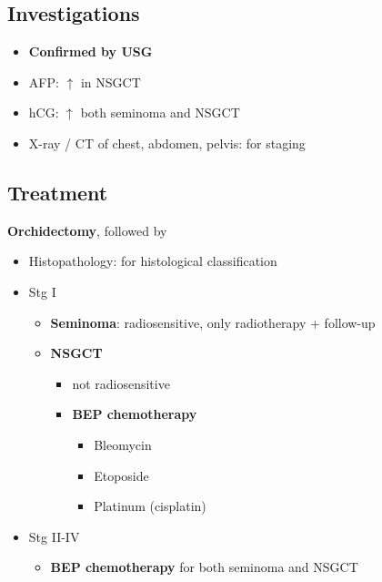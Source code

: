 \documentclass[
  12pt,
]{memoir}
\providecommand{\tightlist}{%
  \setlength{\itemsep}{0pt}\setlength{\parskip}{0pt}}
\begin{document}
\hypertarget{investigations-8}{%
\subsection{Investigations}\label{investigations-8}}

\begin{itemize}
\tightlist
\item
  \textbf{Confirmed by USG}
\item
  AFP: \(\uparrow\) in NSGCT
\item
  hCG: \(\uparrow\) both seminoma and NSGCT
\item
  X-ray / CT of chest, abdomen, pelvis: for staging
\end{itemize}

\hypertarget{treatment-8}{%
\subsection{Treatment}\label{treatment-8}}

\textbf{Orchidectomy}, followed by

\begin{itemize}
\tightlist
\item
  Histopathology: for histological classification
\item
  Stg I

  \begin{itemize}
  \tightlist
  \item
    \textbf{Seminoma}: radiosensitive, only radiotherapy + follow-up
  \item
    \textbf{NSGCT}

    \begin{itemize}
    \tightlist
    \item
      not radiosensitive
    \item
      \textbf{BEP chemotherapy}

      \begin{itemize}
      \tightlist
      \item
        Bleomycin
      \item
        Etoposide
      \item
        Platinum (cisplatin)
      \end{itemize}
    \end{itemize}
  \end{itemize}
\item
  Stg II-IV

  \begin{itemize}
  \tightlist
  \item
    \textbf{BEP chemotherapy} for both seminoma and NSGCT
  \end{itemize}
\end{itemize}
\end{document}
